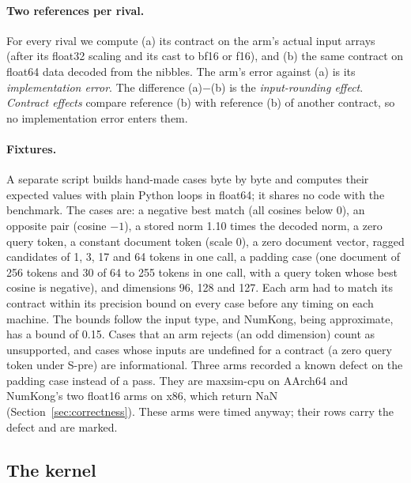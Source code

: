 \paragraph{Two references per rival.}
For every rival we compute (a) its contract on the arm's actual input arrays (after its float32 scaling and its cast to bf16 or f16), and (b) the same contract on float64 data decoded from the nibbles.
The arm's error against (a) is its \emph{implementation error}.
The difference (a)$-$(b) is the \emph{input-rounding effect}.
\emph{Contract effects} compare reference (b) with reference (b) of another contract, so no implementation error enters them.

\paragraph{Fixtures.}
A separate script builds hand-made cases byte by byte and computes their expected values with plain Python loops in float64; it shares no code with the benchmark.
The cases are: a negative best match (all cosines below 0), an opposite pair (cosine $-1$), a stored norm 1.10 times the decoded norm, a zero query token, a constant document token (scale 0), a zero document vector, ragged candidates of 1, 3, 17 and 64 tokens in one call, a padding case (one document of 256 tokens and 30 of 64 to 255 tokens in one call, with a query token whose best cosine is negative), and dimensions 96, 128 and 127.
Each arm had to match its contract within its precision bound on every case before any timing on each machine.
The bounds follow the input type, and NumKong, being approximate, has a bound of 0.15.
Cases that an arm rejects (an odd dimension) count as unsupported, and cases whose inputs are undefined for a contract (a zero query token under S-pre) are informational.
Three arms recorded a known defect on the padding case instead of a pass. They are maxsim-cpu on AArch64 and NumKong's two float16 arms on x86, which return NaN (Section~\ref{sec:correctness}). These arms were timed anyway; their rows carry the defect and are marked.

\subsection{The \sweet kernel}
\label{sec:kernel}


